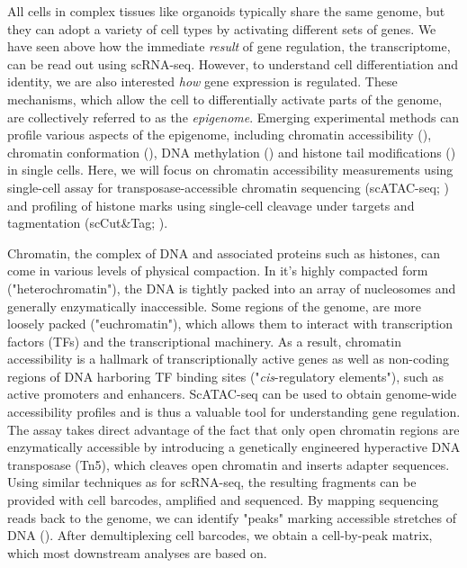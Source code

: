 All cells in complex tissues like organoids typically share the same genome, but they can adopt a variety of cell types by activating different sets of genes. We have seen above how the immediate \textit{result} of gene regulation, the transcriptome, can be read out using scRNA-seq. However, to understand cell differentiation and identity, we are also interested \textit{how} gene expression is regulated. These mechanisms, which allow the cell to differentially activate parts of the genome, are collectively referred to as the \textit{epigenome}. Emerging experimental methods can profile various aspects of the epigenome, including chromatin accessibility (\cite{buenrostro_single-cell_2015,cusanovich_multiplex_2015}), chromatin conformation (\cite{ramani_massively_2017,stevens_3d_2017}), DNA methylation (\cite{smallwood_single-cell_2014}) and histone tail modifications (\cite{kaya-okur_cuttag_2019,bartosovic_single-cell_2021,ku_single-cell_2019,hainer_profiling_2019}) in single cells. Here, we will focus on chromatin accessibility measurements using single-cell assay for transposase-accessible chromatin sequencing (scATAC-seq; \cite{buenrostro_single-cell_2015}) and profiling of histone marks using single-cell cleavage under targets and tagmentation (scCut\&Tag; \cite{kaya-okur_cuttag_2019}).

Chromatin, the complex of DNA and associated proteins such as histones, can come in various levels of physical compaction. In it's highly compacted form ("heterochromatin"), the DNA is tightly packed into an array of nucleosomes and generally enzymatically inaccessible. Some regions of the genome, are more loosely packed ("euchromatin"), which allows them to interact with transcription factors (TFs) and the transcriptional machinery. As a result, chromatin accessibility is a hallmark of transcriptionally active genes as well as non-coding regions of DNA harboring TF binding sites ("\textit{cis}-regulatory elements"), such as active promoters and enhancers. ScATAC-seq can be used to obtain genome-wide accessibility profiles and is thus a valuable tool for understanding gene regulation. The assay takes direct advantage of the fact that only open chromatin regions are enzymatically accessible by introducing a genetically engineered hyperactive DNA transposase (Tn5), which cleaves open chromatin and inserts adapter sequences. Using similar techniques as for scRNA-seq, the resulting fragments can be provided with cell barcodes, amplified and sequenced. By mapping sequencing reads back to the genome, we can identify "peaks" marking accessible stretches of DNA (\cite{zhang_model-based_2008}). After demultiplexing cell barcodes, we obtain a cell-by-peak matrix, which most downstream analyses are based on.

